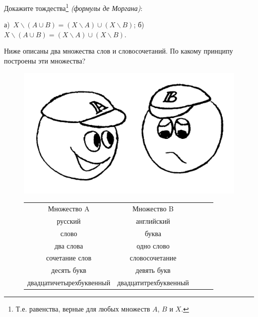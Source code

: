 
\begin{thm}
Докажите тождества\footnote{Т.е. равенства, верные для любых множеств $A$, $B$ и $X$.} \textit{(формулы де Моргана)}: 
\par
а)~$X \backslash (A \cup B) = (X \backslash A) \cup (X \backslash B)$;
\hfill
б)~$X \backslash (A \cup B) = (X \backslash A) \cup (X \backslash B)$.
\end{thm}

\begin{thm}
Ниже описаны два множества слов и словосочетаний. По какому принципу построены эти множества?

{\setlength{\intextsep}{2pt}
\begin{figure}[h]

\begin{minipage}{0.33\linewidth}
    \includegraphics[scale=0.095]{img/veselo.png}
\end{minipage}
\hfill
\begin{minipage}{0.65\linewidth}\setlength{\parindent}{1.5em}
\centering
\begin{tabular}{cclll}
Множество A                                    & Множество B                                &  &  &  \\ \cline{1-2}
\multicolumn{1}{|c|}{русский}                  & \multicolumn{1}{c|}{английский}            &  &  &  \\ \cline{1-2}
\multicolumn{1}{|c|}{слово}                    & \multicolumn{1}{c|}{буква}                 &  &  &  \\ \cline{1-2}
\multicolumn{1}{|c|}{два слова}                & \multicolumn{1}{c|}{одно слово}            &  &  &  \\ \cline{1-2}
\multicolumn{1}{|c|}{сочетание слов}           & \multicolumn{1}{c|}{словосочетание}        &  &  &  \\ \cline{1-2}
\multicolumn{1}{|c|}{десять букв}              & \multicolumn{1}{c|}{девять букв}           &  &  &  \\ \cline{1-2}
\multicolumn{1}{|c|}{двадцатичетырехбуквенный} & \multicolumn{1}{c|}{двадцатитрехбуквенный} &  &  &  \\ \cline{1-2}
\end{tabular}
\end{minipage}

\end{figure}}

\end{thm}

